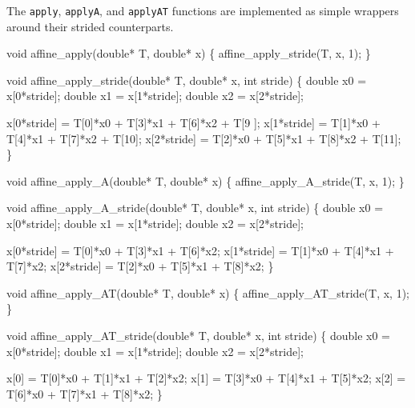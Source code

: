 \nwendcode{}\nwdocspar

The {\tt{}apply}, {\tt{}apply{}A}, and {\tt{}apply{}AT} functions are
implemented as simple wrappers around their strided
counterparts.

\nwenddocs{}\plusendmoddef
void affine_apply(double* T, double* x)
\{
    affine_apply_stride(T, x, 1);
\}

void affine_apply_stride(double* T, double* x, int stride)
\{
    double x0 = x[0*stride];
    double x1 = x[1*stride];
    double x2 = x[2*stride];

    x[0*stride] = T[0]*x0 + T[3]*x1 + T[6]*x2 + T[9 ];
    x[1*stride] = T[1]*x0 + T[4]*x1 + T[7]*x2 + T[10];
    x[2*stride] = T[2]*x0 + T[5]*x1 + T[8]*x2 + T[11];
\}

\nwendcode{}\nwdocspar

\nwenddocs{}\plusendmoddef
void affine_apply_A(double* T, double* x)
\{
    affine_apply_A_stride(T, x, 1);
\}

void affine_apply_A_stride(double* T, double* x, int stride)
\{
    double x0 = x[0*stride];
    double x1 = x[1*stride];
    double x2 = x[2*stride];

    x[0*stride] = T[0]*x0 + T[3]*x1 + T[6]*x2;
    x[1*stride] = T[1]*x0 + T[4]*x1 + T[7]*x2;
    x[2*stride] = T[2]*x0 + T[5]*x1 + T[8]*x2;
\}

\nwendcode{}\nwdocspar

\nwenddocs{}\plusendmoddef
void affine_apply_AT(double* T, double* x)
\{
    affine_apply_AT_stride(T, x, 1);
\}

void affine_apply_AT_stride(double* T, double* x, int stride)
\{
    double x0 = x[0*stride];
    double x1 = x[1*stride];
    double x2 = x[2*stride];

    x[0] = T[0]*x0 + T[1]*x1 + T[2]*x2;
    x[1] = T[3]*x0 + T[4]*x1 + T[5]*x2;
    x[2] = T[6]*x0 + T[7]*x1 + T[8]*x2;
\}

\nwendcode{}

%
%
%
%
%
\nwdocspar


\nwenddocs{}
